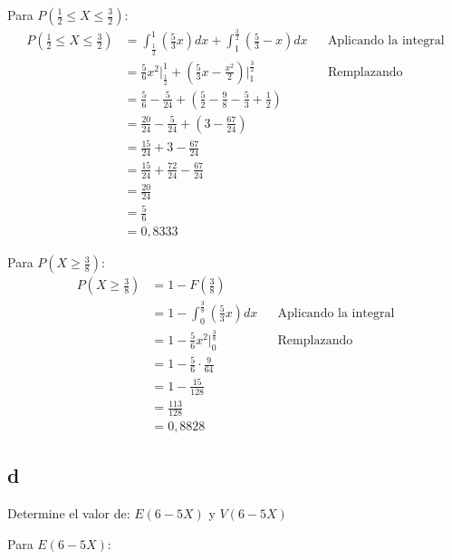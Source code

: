\documentclass{templateNote}
\begin{document}
Para $\displaystyle P\left(\frac{1}{2} \leq X \leq \frac{3}{2}\right)$:
\begin{align*}
    \displaystyle P\left(\frac{1}{2} \leq X \leq \frac{3}{2}\right) &= \int_{\frac{1}{2}}^{1}{(\frac{5}{3}x)dx} + \int_{1}^{\frac{3}{2}}{{(\frac{5}{3} - x)dx}} && \text{Aplicando la integral} \\
    &= \frac{5}{6}x^2 \Big|_{\frac{1}{2}}^{1} + (\frac{5}{3}x - \frac{x^2}{2}) \Big|_{1}^{\frac{3}{2}} && \text{Remplazando} \\
    &= \frac{5}{6} - \frac{5}{24} + (\frac{5}{2} - \frac{9}{8} - \frac{5}{3} + \frac{1}{2}) \\
    &= \frac{20}{24} - \frac{5}{24} + (3 - \frac{67}{24}) \\
    &= \frac{15}{24} + 3 - \frac{67}{24} \\
    &= \frac{15}{24} + \frac{72}{24} - \frac{67}{24} \\
    &= \frac{20}{24} \\
    &= \frac{5}{6} \\
    &= 0,8333
\end{align*}

Para $\displaystyle P\left(X \geq \frac{3}{8}\right)$:
\begin{align*}
    \displaystyle P\left(X \geq \frac{3}{8}\right) &= 1 - F(\frac{3}{8})\\
    &= 1 - \int_{0}^{\frac{3}{8}}{(\frac{5}{3}x)dx} && \text{Aplicando la integral} \\
    &= 1 - \frac{5}{6}x^2 \Big|_{0}^{\frac{3}{8}} && \text{Remplazando} \\
    &= 1 - \frac{5}{6} \cdot \frac{9}{64} \\
    &= 1 - \frac{15}{128} \\
    &= \frac{113}{128} \\
    &= 0,8828
\end{align*}

\subsection{d}
Determine el valor de: $E(6-5X)$ y $V(6-5X)$

Para $E(6-5X)$:
\end{document}
